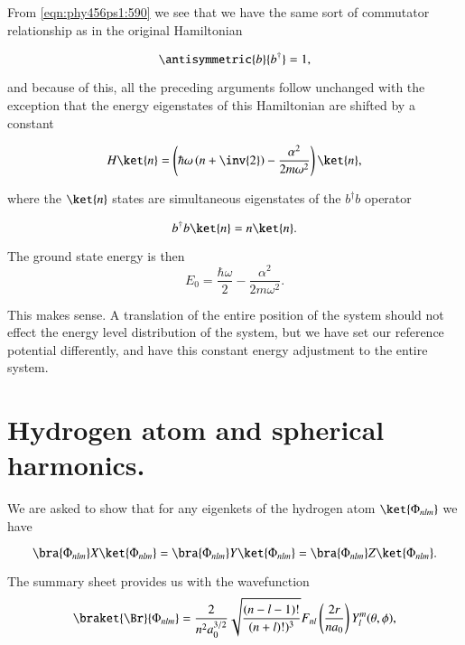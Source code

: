 From \ref{eqn:phy456ps1:590} we see that we have the same sort of commutator relationship as in the original Hamiltonian

\begin{equation}\label{eqn:phy456ps1:610}
\antisymmetric{b}{b^\dagger} = 1,
\end{equation}

and because of this, all the preceding arguments follow unchanged with the exception that the energy eigenstates of this Hamiltonian are shifted by a constant

\begin{equation}\label{eqn:phy456ps1:620}
H \ket{n} = \left( \hbar \omega \left( n + \inv{2} \right) - \frac{\alpha^2}{2 m \omega^2} \right) \ket{n},
\end{equation}

where the $\ket{n}$ states are simultaneous eigenstates of the $b^\dagger b$ operator

\begin{equation}\label{eqn:phy456ps1:630}
b^\dagger b \ket{n} = n \ket{n}.
\end{equation}

The ground state energy is then
\begin{equation}\label{eqn:phy456ps1:640}
E_0 = \frac{\hbar \omega }{2} - \frac{\alpha^2}{2 m \omega^2}.
\end{equation}

This makes sense.  A translation of the entire position of the system should not effect the energy level distribution of the system, but we have set our reference potential differently, and have this constant energy adjustment to the entire system.

\section{Hydrogen atom and spherical harmonics.}

We are asked to show that for any eigenkets of the hydrogen atom $\ket{\Phi_{nlm}}$ we have

\begin{equation}\label{eqn:phy456ps1:700}
\bra{\Phi_{nlm}} X \ket{\Phi_{nlm}} 
=
\bra{\Phi_{nlm}} Y \ket{\Phi_{nlm}} 
=
\bra{\Phi_{nlm}} Z \ket{\Phi_{nlm}}.
\end{equation}

The summary sheet provides us with the wavefunction
\begin{equation}\label{eqn:phy456ps1:720}
\braket{\Br}{\Phi_{nlm}} = 
\frac{2}{n^2 a_0^{3/2}} \sqrt{\frac{(n-l-1)!}{(n+l)!)^3}} F_{nl}\left( \frac{2r}{n a_0} \right) Y_l^m(\theta, \phi),
\end{equation}

